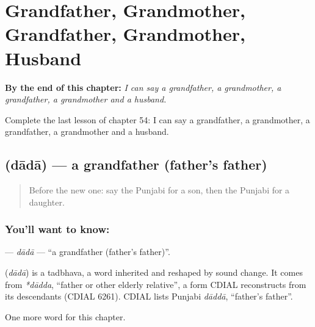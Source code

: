 
\chapter{Grandfather, Grandmother, Grandfather, Grandmother, Husband}
\label{ch:pa-grandfather-grandmother-grandfather-grandmother-husband}

\begin{chapteropening}
\textbf{By the end of this chapter:} \emph{I can say a grandfather, a grandmother, a grandfather, a grandmother and a husband.}

Complete the last lesson of chapter 54: I can say a grandfather, a grandmother, a grandfather, a grandmother and a husband.
\end{chapteropening}

\section[\texorpdfstring{\pa{ਦਾਦਾ} (dādā)}{ਦਾਦਾ (dādā)}]{ (dādā) — a grandfather (father's father)}

\label{lesson:PA-C54-dada}



\begin{quote}
Before the new one: say the Punjabi for a son, then the Punjabi for a daughter.
\end{quote}

\subsection*{You'll want to know: }
\textbf{} — \emph{dādā} — \textquotedblleft{}a grandfather (father's father)\textquotedblright{}.

\begin{cousinweb}
\textbf{} (\emph{dādā}) is a tadbhava, a word inherited and reshaped by sound change. It comes from \emph{*dādda}, \textquotedblleft{}father or other elderly relative\textquotedblright{}, a form CDIAL reconstructs from its descendants (CDIAL 6261). CDIAL lists Punjabi \emph{dāddā}, \textquotedblleft{}father's father\textquotedblright{}.
\end{cousinweb}

\begin{grammarlens}[title={What you've built}]
One more word for this chapter.
\end{grammarlens}


